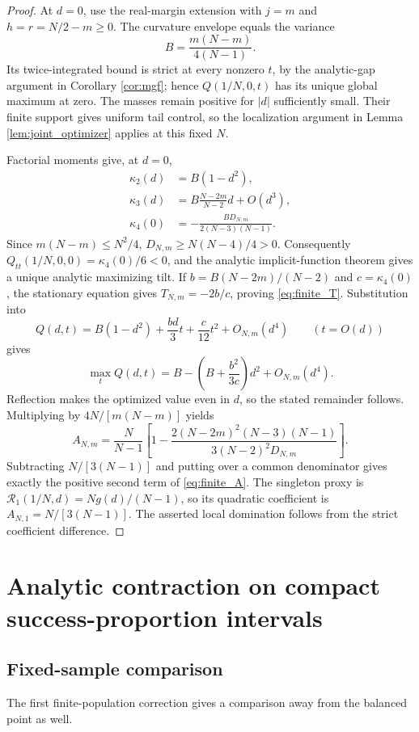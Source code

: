 \documentclass[11pt,a4paper]{article}
\begin{document}
\begin{proof}
At $d=0$, use the real-margin extension with $j=m$ and $h=r=N/2-m\ge0$. The curvature envelope equals the variance
\[
 B=\frac{m(N-m)}{4(N-1)}.
\]
Its twice-integrated bound is strict at every nonzero $t$, by the analytic-gap argument in Corollary \ref{cor:mgf}; hence $Q(1/N,0,t)$ has its unique global maximum at zero. The masses remain positive for $|d|$ sufficiently small. Their finite support gives uniform tail control, so the localization argument in Lemma \ref{lem:joint_optimizer} applies at this fixed $N$.

Factorial moments give, at $d=0$,
\begin{align*}
 \kappa_2(d)&=B(1-d^2),\\
 \kappa_3(d)&=B\frac{N-2m}{N-2}d+O(d^3),\\
 \kappa_4(0)&=-\frac{BD_{N,m}}{2(N-3)(N-1)}.
\end{align*}
Since $m(N-m)\le N^2/4$, $D_{N,m}\ge N(N-4)/4>0$. Consequently $Q_{tt}(1/N,0,0)=\kappa_4(0)/6<0$, and the analytic implicit-function theorem gives a unique analytic maximizing tilt. If $b=B(N-2m)/(N-2)$ and $c=\kappa_4(0)$, the stationary equation gives $T_{N,m}=-2b/c$, proving \eqref{eq:finite_T}. Substitution into
\[
 Q(d,t)=B(1-d^2)+\frac{bd}{3}t+\frac c{12}t^2
 +O_{N,m}(d^4)\qquad(t=O(d))
\]
gives
\[
 \max_tQ(d,t)=B-\left(B+\frac{b^2}{3c}\right)d^2+O_{N,m}(d^4).
\]
Reflection makes the optimized value even in $d$, so the stated remainder follows. Multiplying by $4N/[m(N-m)]$ yields
\[
 A_{N,m}=\frac N{N-1}\left[
 1-\frac{2(N-2m)^2(N-3)(N-1)}{3(N-2)^2D_{N,m}}\right].
\]
Subtracting $N/[3(N-1)]$ and putting over a common denominator gives exactly the positive second term of \eqref{eq:finite_A}. The singleton proxy is $\mathcal R_1(1/N,d)=N g(d)/(N-1)$, so its quadratic coefficient is $A_{N,1}=N/[3(N-1)]$. The asserted local domination follows from the strict coefficient difference.
\end{proof}



\section{Analytic contraction on compact success-proportion intervals}\label{app:contraction}
\subsection{Fixed-sample comparison}
The first finite-population correction gives a comparison away from the balanced point as well.
\end{document}
